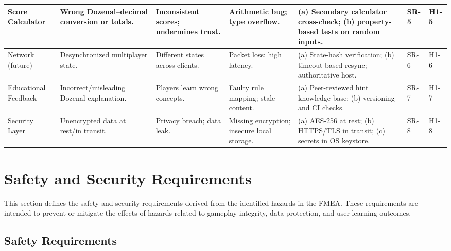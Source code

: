 \documentclass{article}
\begin{document}
\begin{small}
\begin{longtable}{@{}p{2.6cm} p{3.2cm} p{3.0cm} p{3.0cm} p{6.0cm} p{1.2cm} p{1.2cm}@{}}
            Score Calculator &
            Wrong Dozenal–decimal conversion or totals. &
            Inconsistent scores; undermines trust. &
            Arithmetic bug; type overflow. &
            (a) Secondary calculator cross-check; (b) property-based tests on random inputs. &
            SR-5 & H1-5 \\ \midrule

            Network (future) &
            Desynchronized multiplayer state. &
            Different states across clients. &
            Packet loss; high latency. &
            (a) State-hash verification; (b) timeout-based resync; authoritative host. &
            SR-6 & H1-6 \\ \midrule

            Educational Feedback &
            Incorrect/misleading Dozenal explanation. &
            Players learn wrong concepts. &
            Faulty rule mapping; stale content. &
            (a) Peer-reviewed hint knowledge base; (b) versioning and CI checks. &
            SR-7 & H1-7 \\ \midrule

            Security Layer &
            Unencrypted data at rest/in transit. &
            Privacy breach; data leak. &
            Missing encryption; insecure local storage. &
            (a) AES-256 at rest; (b) HTTPS/TLS in transit; (c) secrets in OS keystore. &
            SR-8 & H1-8 \\
        \end{longtable}
    \end{small}
    
\section{Safety and Security Requirements}

This section defines the safety and security requirements derived from the 
identified hazards in the FMEA. These requirements are intended to prevent or 
mitigate the effects of hazards related to gameplay integrity, data protection, 
and user learning outcomes.

\subsection{Safety Requirements}
\end{document}

